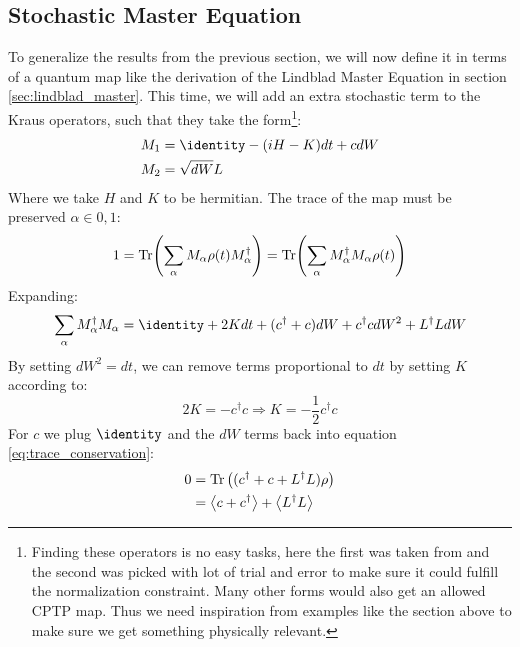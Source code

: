 
\subsection{Stochastic Master Equation} 
To generalize the results from the previous section, we will now define it in terms of a quantum map like the derivation of the Lindblad Master Equation in section \ref{sec:lindblad_master}. This time, we will add an extra stochastic term to the Kraus operators, such that they take the form\footnote{Finding these operators is no easy tasks, here the first was taken from \cite{jacobs_straightforward_2006} and the second was picked with lot of trial and error to make sure it could fulfill the normalization constraint. Many other forms would also get an allowed CPTP map. Thus we need inspiration from examples like the section above to make sure we get something physically relevant.}:
\begin{align}
    M_1      &=  \identity - (iH - K)dt + cdW \\
    M_2      &=  \sqrt{dW} L
\end{align}
Where we take $H$ and $K$ to be hermitian. The trace of the map must be preserved $\alpha \in {0, 1}$:
\begin{equation}
    1 = \Tr(\sum_\alpha M_\alpha \rho(t) M_\alpha^\dagger) = \Tr(\sum_\alpha M_\alpha^\dagger M_\alpha \rho(t))
\end{equation}
Expanding:
\begin{equation}\label{eq:trace_conservation}
    \sum_\alpha M_\alpha^\dagger M_\alpha = \identity + 2K dt +  (c^\dagger + c)dW + c^\dagger c dW^2 + L^\dagger L dW
\end{equation}
By setting $dW^2 = dt$, we can remove terms proportional to $dt$ by setting $K$ according to:
\begin{equation}
    2K = -c^\dagger c \Rightarrow K = -\frac12 c^\dagger c 
\end{equation}
For $c$ we plug $\identity$ and the $dW$ terms back into equation \ref{eq:trace_conservation}:
\begin{align}
    0 &= \Tr\left((c^\dagger + c + L^\dagger L)\rho \right) \\
      &= \expval{c + c^\dagger} + \expval{L^\dagger L}
\end{align}
